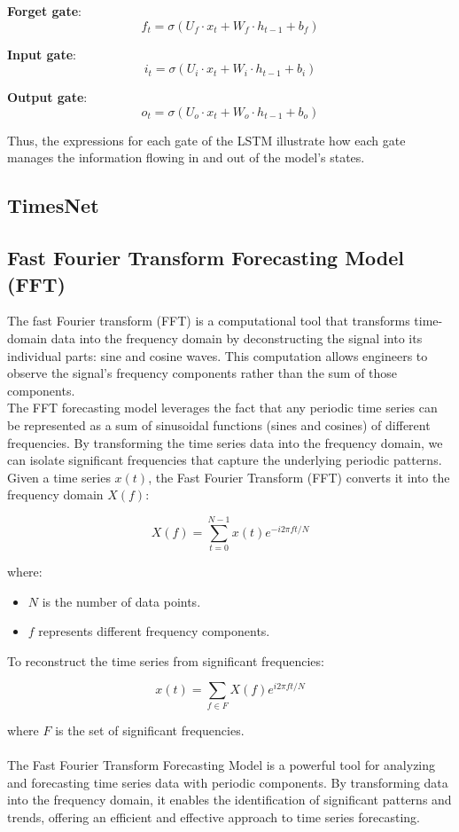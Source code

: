 \documentclass{ieeeojies}
\begin{document}
\noindent \textbullet \textbf{ Forget gate}:
\[
f_t = \sigma(U_f \cdot x_t + W_f \cdot h_{t-1} + b_f)
\]

\noindent \textbullet \textbf{ Input gate}:
\[
i_t = \sigma(U_i \cdot x_t + W_i \cdot h_{t-1} + b_i)
\]

\noindent \textbullet \textbf{ Output gate}:
\[
o_t = \sigma(U_o \cdot x_t + W_o \cdot h_{t-1} + b_o)
\]

Thus, the expressions for each gate of the LSTM illustrate how each gate manages the information flowing in and out of the model's states.


  \subsection{TimesNet}
  \subsection{Fast Fourier Transform Forecasting Model (FFT)}
  The fast Fourier transform (FFT) is a computational tool that transforms time-domain data into the frequency domain by deconstructing the signal into its individual parts: sine and cosine waves. This computation allows engineers to observe the signal’s frequency components rather than the sum of those components.
  \\ 
  The FFT forecasting model leverages the fact that any periodic time series can be represented as a sum of sinusoidal functions (sines and cosines) of different frequencies. By transforming the time series data into the frequency domain, we can isolate significant frequencies that capture the underlying periodic patterns.
 \\
 Given a time series \( x(t) \), the Fast Fourier Transform (FFT) converts it into the frequency domain \( X(f) \):

\[
X(f) = \sum_{t=0}^{N-1} x(t) e^{-i 2\pi ft / N}
\]

where:
\begin{itemize}
    \item \( N \) is the number of data points.
    \item \( f \) represents different frequency components.
\end{itemize}
To reconstruct the time series from significant frequencies:

\[
x(t) = \sum_{f \in F} X(f) e^{i 2\pi ft / N}
\]

where \( F \) is the set of significant frequencies.
\\\\
The Fast Fourier Transform Forecasting Model is a powerful tool for analyzing and forecasting time series data with periodic components. By transforming data into the frequency domain, it enables the identification of significant patterns and trends, offering an efficient and effective approach to time series forecasting.
\end{document}
